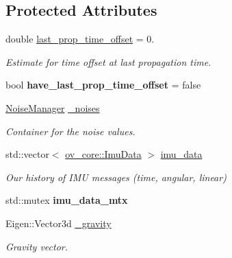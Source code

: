 \subsection*{Protected Attributes}
\begin{DoxyCompactItemize}
\item 
\mbox{\label{classov__msckf_1_1Propagator_a2199da5257d46ee711371550c734dc9a}} 
double \hyperlink{classov__msckf_1_1Propagator_a2199da5257d46ee711371550c734dc9a}{last\+\_\+prop\+\_\+time\+\_\+offset} = 0.
\begin{DoxyCompactList}\small\item\em Estimate for time offset at last propagation time. \end{DoxyCompactList}\item 
\mbox{\label{classov__msckf_1_1Propagator_a7affb32669bf959625b65fb80a9af6a2}} 
bool {\bfseries have\+\_\+last\+\_\+prop\+\_\+time\+\_\+offset} = false
\item 
\mbox{\label{classov__msckf_1_1Propagator_a3f19a5f9fdb86733cfb0dcc040313f38}} 
\hyperlink{structov__msckf_1_1NoiseManager}{Noise\+Manager} \hyperlink{classov__msckf_1_1Propagator_a3f19a5f9fdb86733cfb0dcc040313f38}{\+\_\+noises}
\begin{DoxyCompactList}\small\item\em Container for the noise values. \end{DoxyCompactList}\item 
\mbox{\label{classov__msckf_1_1Propagator_aa1639a14dc1149d2e47be177bf33b572}} 
std\+::vector$<$ \hyperlink{structov__core_1_1ImuData}{ov\+\_\+core\+::\+Imu\+Data} $>$ \hyperlink{classov__msckf_1_1Propagator_aa1639a14dc1149d2e47be177bf33b572}{imu\+\_\+data}
\begin{DoxyCompactList}\small\item\em Our history of I\+MU messages (time, angular, linear) \end{DoxyCompactList}\item 
\mbox{\label{classov__msckf_1_1Propagator_a9495dd802925abfde162f280f8f9d325}} 
std\+::mutex {\bfseries imu\+\_\+data\+\_\+mtx}
\item 
\mbox{\label{classov__msckf_1_1Propagator_a6a5ea009315ab578b48f079d502f97ab}} 
Eigen\+::\+Vector3d \hyperlink{classov__msckf_1_1Propagator_a6a5ea009315ab578b48f079d502f97ab}{\+\_\+gravity}
\begin{DoxyCompactList}\small\item\em Gravity vector. \end{DoxyCompactList}\end{DoxyCompactItemize}


